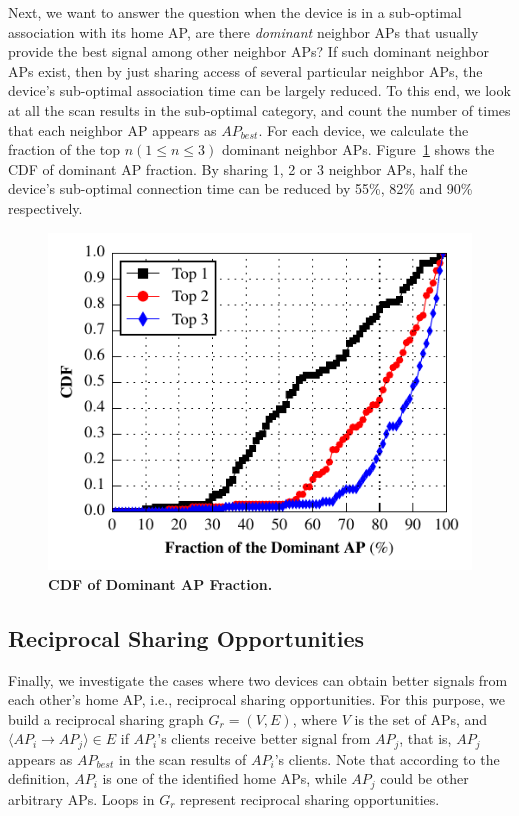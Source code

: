 Next, we want to answer the question when the device is in a sub-optimal association
with its home AP, are there \textit{dominant} neighbor APs that
usually provide the best signal among other neighbor APs? If such dominant
neighbor APs exist, then by just sharing access of several particular neighbor
APs, the device's sub-optimal association time can be largely reduced. To this
end, we look at all the scan results in the sub-optimal category, and count the
number of times that each neighbor AP appears as $AP_{best}$. For each device,
we calculate the fraction of the top $n (1 \le n \le 3)$ dominant neighbor APs.
Figure~\ref{fig:dominantap} shows the CDF of dominant AP fraction. By sharing 1,
2 or 3 neighbor APs, half the device's sub-optimal connection time can be
reduced by 55\%, 82\% and 90\% respectively.

\begin{figure}[t]
  \centering
  \includegraphics[width=\columnwidth]{./figures/DominantNeighborAPFigure.pdf}
  \caption{\textbf{CDF of Dominant AP Fraction.}}
  \label{fig:dominantap}
\end{figure}

\subsection{Reciprocal Sharing Opportunities}
\label{subsec:reciprocal}

Finally, we investigate the cases where two devices can obtain better signals
from each other's home AP, i.e., reciprocal sharing opportunities. For this
purpose, we build a reciprocal sharing graph $G_r=(V, E)$, where $V$ is the set
of APs, and $\langle AP_i \rightarrow AP_j \rangle \in E$ if $AP_i$'s clients
receive better signal from $AP_j$, that is, $AP_j$ appears as $AP_{best}$ in the
scan results of $AP_i$'s clients. Note that according to the definition, $AP_i$
is one of the identified home APs, while $AP_j$ could be other arbitrary APs.
Loops in $G_r$ represent reciprocal sharing opportunities.

